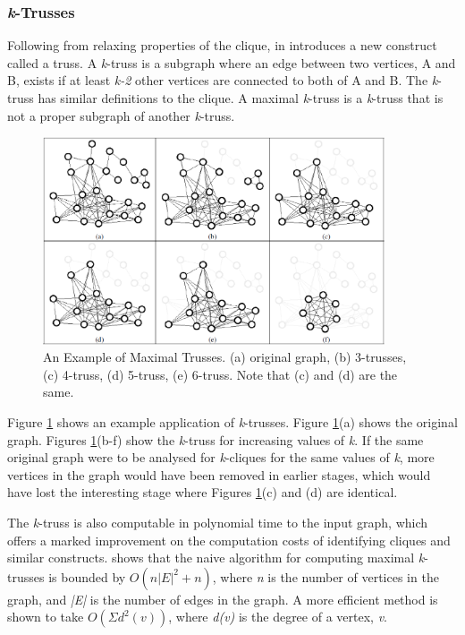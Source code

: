 \subsubsection{\emph{k}-Trusses}
Following from relaxing properties of the clique, \citeauthor{trusses} in \cite{trusses} introduces a new construct called a truss. A \emph{k}-truss is a subgraph where an edge between two vertices, A and B, exists if at least \emph{k-2} other vertices are connected to both of A and B. The \emph{k}-truss has similar definitions to the clique. A maximal \emph{k}-truss is a \emph{k}-truss that is not a proper subgraph of another \emph{k}-truss.

\begin{figure}[htbp]
\centering
\includegraphics[width=0.9\textwidth]{./img/trusses.png}
\caption{An Example of Maximal Trusses. (a) original graph, (b) 3-trusses, (c) 4-truss, (d) 5-truss, (e) 6-truss. Note that (c) and (d) are the same. \cite{trusses}}
\label{fig:trusses}
\end{figure}

Figure \ref{fig:trusses} shows an example application of \emph{k}-trusses. Figure \ref{fig:trusses}(a) shows the original graph. Figures \ref{fig:trusses}(b-f) show the \emph{k}-truss for increasing values of \emph{k}. If the same original graph were to be analysed for \emph{k}-cliques for the same values of \emph{k}, more vertices in the graph would have been removed in earlier stages, which would have lost the interesting stage where Figures \ref{fig:trusses}(c) and (d) are identical.

The \emph{k}-truss is also computable in polynomial time to the input graph, which offers a marked improvement on the computation costs of identifying cliques and similar constructs. \cite{trusses} shows that the naive algorithm  for computing maximal \emph{k}-trusses is bounded by $O(n|E|^2 + n)$, where \emph{n} is the number of vertices in the graph, and \emph{|E|} is the number of edges in the graph. A more efficient method is shown to take $O(\Sigma d^2(v))$, where \emph{d(v)} is the degree of a vertex, \emph{v}.
